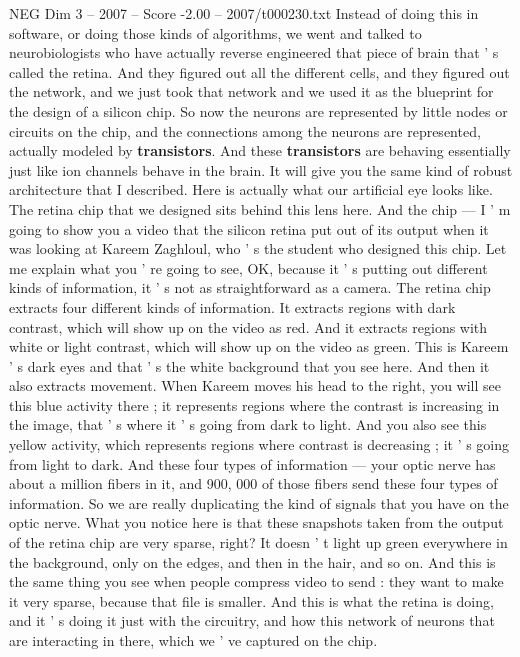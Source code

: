 \begin{textsample}{NEG Dim 3 – 2007 – Score -2.00 – 2007/t000230.txt}
Instead of doing this in software, or doing those kinds of algorithms, we went and talked to neurobiologists who have actually reverse engineered that piece of brain that ' s called the retina.
And they figured out all the different cells, and they figured out the network, and we just took that network and we used it as the blueprint for the design of a silicon chip.
So now the neurons are represented by little nodes or circuits on the chip, and the connections among the neurons are represented, actually modeled by \textbf{transistors}.
And these \textbf{transistors} are behaving essentially just like ion channels behave in the brain.
It will give you the same kind of robust architecture that I described.
Here is actually what our artificial eye looks like.
The retina chip that we designed sits behind this lens here.
And the chip — I ' m going to show you a video that the silicon retina put out of its output when it was looking at Kareem Zaghloul, who ' s the student who designed this chip.
Let me explain what you ' re going to see, OK, because it ' s putting out different kinds of information, it ' s not as straightforward as a camera.
The retina chip extracts four different kinds of information.
It extracts regions with dark contrast, which will show up on the video as red.
And it extracts regions with white or light contrast, which will show up on the video as green.
This is Kareem ' s dark eyes and that ' s the white background that you see here.
And then it also extracts movement.
When Kareem moves his head to the right, you will see this blue activity there ; it represents regions where the contrast is increasing in the image, that ' s where it ' s going from dark to light.
And you also see this yellow activity, which represents regions where contrast is decreasing ; it ' s going from light to dark.
And these four types of information — your optic nerve has about a million fibers in it, and 900, 000 of those fibers send these four types of information.
So we are really duplicating the kind of signals that you have on the optic nerve.
What you notice here is that these snapshots taken from the output of the retina chip are very sparse, right?
It doesn ' t light up green everywhere in the background, only on the edges, and then in the hair, and so on.
And this is the same thing you see when people compress video to send : they want to make it very sparse, because that file is smaller.
And this is what the retina is doing, and it ' s doing it just with the circuitry, and how this network of neurons that are interacting in there, which we ' ve captured on the chip.

\end{textsample}
